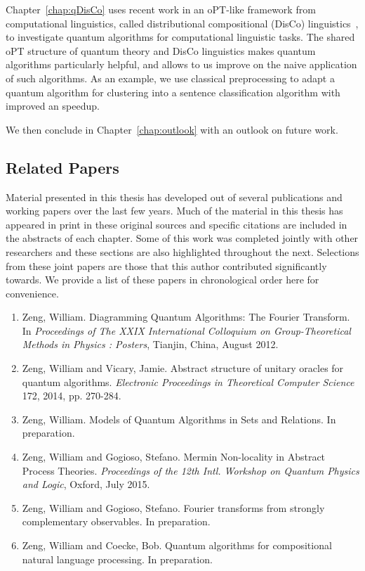 Chapter~\ref{chap:qDisCo} uses recent work in an oPT-like framework from computational linguistics, called distributional compositional (DisCo) linguistics~\cite{clark2008compositional}, to investigate quantum algorithms for computational linguistic tasks. The shared oPT structure of quantum theory and DisCo linguistics makes quantum algorithms particularly helpful, and allows to us improve on the naive application of such algorithms. As an example, we use classical preprocessing to adapt a quantum algorithm for clustering into a sentence classification algorithm with improved an speedup.

We then conclude in Chapter~\ref{chap:outlook} with an outlook on future work.
 
\subsection*{Related Papers}

Material presented in this thesis has developed out of several publications and working papers over the last few years. Much of the material in this thesis has appeared in print in these original sources and specific citations are included in the abstracts of each chapter. Some of this work was completed jointly with other researchers and these sections are also highlighted throughout the next.  Selections from these joint papers are those that this author contributed significantly towards. We provide a list of these papers in chronological order here for convenience.

\begin{enumerate}
\item Zeng, William. Diagramming Quantum Algorithms: The Fourier Transform. In \emph{Proceedings of The XXIX International Colloquium on Group-Theoretical Methods in Physics
: Posters}, Tianjin, China, August 2012.
\item Zeng, William and Vicary, Jamie. Abstract structure of unitary oracles for quantum algorithms. \emph{Electronic Proceedings in Theoretical Computer Science} 172, 2014, pp. 270-284.
\item Zeng, William. Models of Quantum Algorithms in Sets and Relations. In preparation.
\item Zeng, William and Gogioso, Stefano. Mermin Non-locality in Abstract Process Theories. \emph{Proceedings of the 12th Intl. Workshop on Quantum Physics and Logic}, Oxford, July 2015.
\item Zeng, William and Gogioso, Stefano. Fourier transforms from strongly complementary observables. In preparation.
\item Zeng, William and Coecke, Bob. Quantum algorithms for compositional natural language processing. In preparation.
\end{enumerate}

